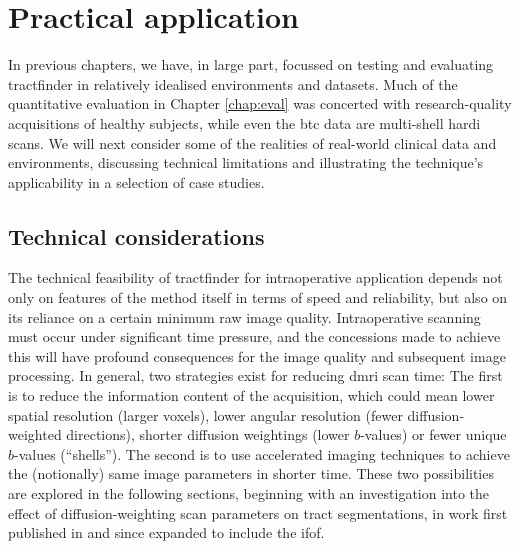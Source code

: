 \chapter{Practical application}
\label{chap:applications}

In previous chapters, we have, in large part, focussed on testing and evaluating tractfinder in relatively idealised environments and datasets.
Much of the quantitative evaluation in Chapter \ref{chap:eval} was concerted with research-quality acquisitions of healthy subjects, while even the \gls{btc} data are multi-shell \gls{hardi} scans.
We will next consider some of the realities of real-world clinical data and environments, discussing technical limitations and illustrating the technique's applicability in a selection of case studies.

\section{Technical considerations}\label{sec:technical}

The technical feasibility of tractfinder for intraoperative application depends not only on features of the method itself in terms of speed and reliability, but also on its reliance on a certain minimum raw image quality.
Intraoperative scanning must occur under significant time pressure, and the concessions made to achieve this will have profound consequences for the image quality and subsequent image processing.
In general, two strategies exist for reducing \gls{dmri} scan time:
The first is to reduce the information content of the acquisition, which could mean lower spatial resolution (larger voxels), lower angular resolution (fewer diffusion-weighted directions), shorter diffusion weightings (lower $b$-values) or fewer unique $b$-values (``shells'').
The second is to use accelerated imaging techniques to achieve the (notionally) same image parameters in shorter time.
These two possibilities are explored in the following sections, beginning with an investigation into the effect of diffusion-weighting scan parameters on tract segmentations, in work first published in \textcite{Young2022a} and since expanded to include the \gls{ifof}.

